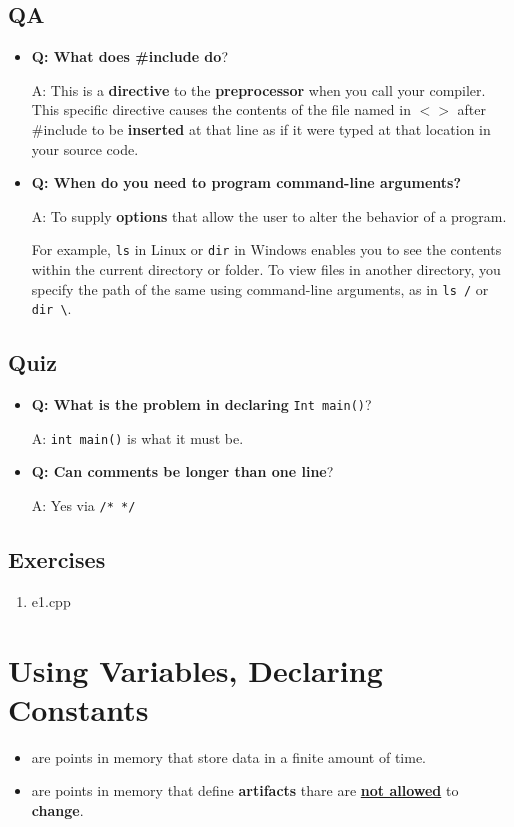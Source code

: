 \documentclass[10pt]{article}
\newcommand{\vocab}[1]{\fbox{\textbf{\textit{#1}}}}
\begin{document}
\newpage

\subsection{QA}
\begin{itemize}
	\item \textbf{Q: What does \#include do}?

		A: This is a \textbf{directive} to the \textbf{preprocessor} when you call your compiler. This specific directive causes the contents of the file named in $<>$ after \#include to be \textbf{inserted} at that line as if it were typed at that location in your source code.\\
	
	\item \textbf{Q: When do you need to program command-line arguments?}

	A: To supply \textbf{options} that allow the user to alter the behavior of a program.

	For example, \verb|ls| in Linux or \verb|dir| in Windows enables you to see the contents within the current directory or folder. To view files in another directory, you specify the path of the same using command-line arguments, as in \verb|ls /| or \verb|dir \|.
\end{itemize}

\newpage
\subsection{Quiz}
\begin{itemize}
	\item \textbf{Q: What is the problem in declaring} \verb|Int main()|?

	A: \verb|int main()| is what it must be.\\ 

	\item \textbf{Q: Can comments be longer than one line}?

	A: Yes via \verb|/* */|
\end{itemize}

\newpage
\subsection{Exercises}
\begin{enumerate}
	\item e1.cpp
\end{enumerate}

\newpage
\section{Using Variables, Declaring Constants}
\begin{itemize}
	\item \vocab{Variables} are points in memory that store data in a finite amount of time.
	\item \vocab{Constants} are points in memory that define \textbf{artifacts} thare are \underline{\textbf{not allowed}} to \textbf{change}.
\end{itemize}
\end{document}
